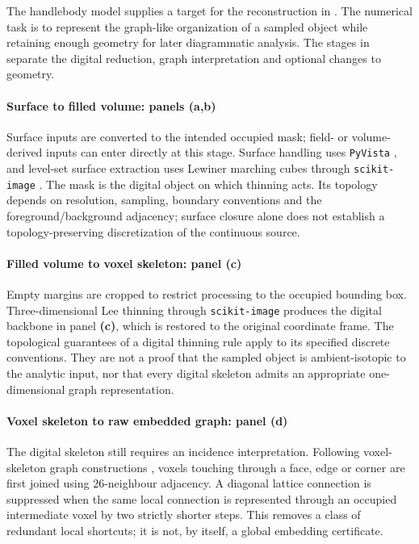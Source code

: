 The handlebody model \cite{kg_ishii2012handlebody} supplies a target for the reconstruction in . The numerical task is to represent the graph-like organization of a sampled object while retaining enough geometry for later diagrammatic analysis. The stages in  separate the digital reduction, graph interpretation and optional changes to geometry.

\paragraph{Surface to filled volume: panels (a,b)}
Surface inputs are converted to the intended occupied mask; field- or volume-derived inputs can enter directly at this stage. Surface handling uses \texttt{PyVista} \cite{kg_sullivan2019pyvista}, and level-set surface extraction uses Lewiner marching cubes through \texttt{scikit-image} \cite{kg_lewiner2003marching,kg_vanderwalt2014skimage}. The mask is the digital object on which thinning acts. Its topology depends on resolution, sampling, boundary conventions and the foreground/background adjacency; surface closure alone does not establish a topology-preserving discretization of the continuous source.

\paragraph{Filled volume to voxel skeleton: panel (c)}
Empty margins are cropped to restrict processing to the occupied bounding box. Three-dimensional Lee thinning through \texttt{scikit-image} \cite{kg_lee1994thinning,kg_vanderwalt2014skimage} produces the digital backbone in panel \textbf{(c)}, which is restored to the original coordinate frame. The topological guarantees of a digital thinning rule apply to its specified discrete conventions. They are not a proof that the sampled object is ambient-isotopic to the analytic input, nor that every digital skeleton admits an appropriate one-dimensional graph representation.

\paragraph{Voxel skeleton to raw embedded graph: panel (d)}
The digital skeleton still requires an incidence interpretation. Following voxel-skeleton graph constructions \cite{kg_reinders2000skeletongraph}, voxels touching through a face, edge or corner are first joined using $26$-neighbour adjacency. A diagonal lattice connection is suppressed when the same local connection is represented through an occupied intermediate voxel by two strictly shorter steps. This removes a class of redundant local shortcuts; it is not, by itself, a global embedding certificate.

